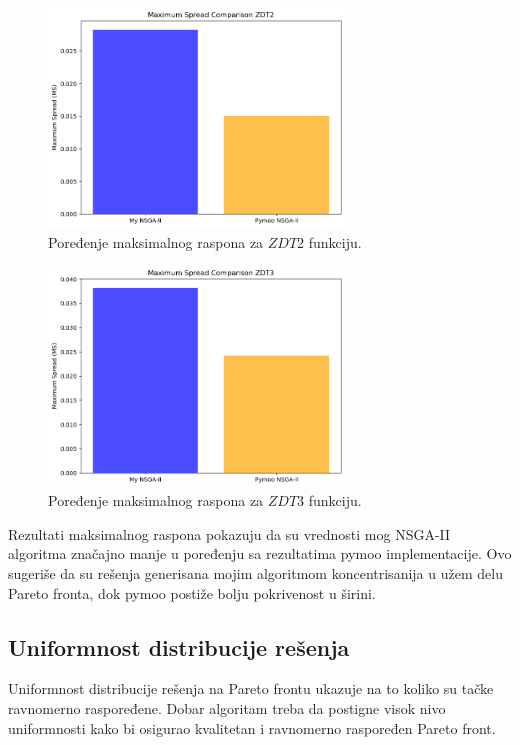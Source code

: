 \documentclass[12pt]{article}
\begin{document}
\begin{figure}[H]
    \centering
    \includegraphics[width=0.7\textwidth]{images/ms_zdt2.png}
    \caption{Poređenje maksimalnog raspona za \( ZDT2 \) funkciju.}
    \label{fig:ms_zdt2}
\end{figure}

\begin{figure}[H]
    \centering
    \includegraphics[width=0.7\textwidth]{images/ms_zdt3.png}
    \caption{Poređenje maksimalnog raspona za \( ZDT3 \) funkciju.}
    \label{fig:ms_zdt3}
\end{figure}

Rezultati maksimalnog raspona pokazuju da su vrednosti mog NSGA-II algoritma značajno manje u poređenju sa rezultatima pymoo implementacije.
Ovo sugeriše da su rešenja generisana mojim algoritmom koncentrisanija u užem delu Pareto fronta, dok pymoo postiže bolju pokrivenost u širini.
 	

\subsection{Uniformnost distribucije rešenja}
Uniformnost distribucije rešenja na Pareto frontu ukazuje na to koliko su tačke ravnomerno raspoređene. Dobar algoritam treba da postigne visok nivo uniformnosti kako bi osigurao kvalitetan i ravnomerno raspoređen Pareto front.
\end{document}
